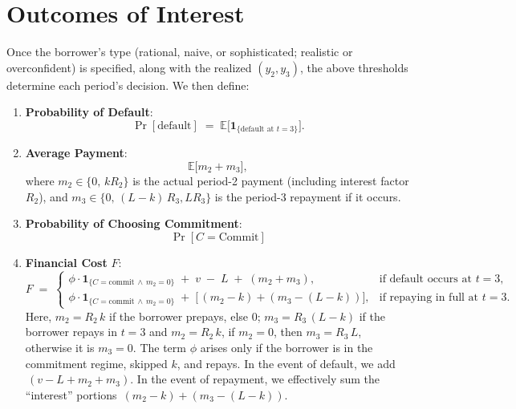 \documentclass[11pt]{article}
\begin{document}

\section{Outcomes of Interest}

Once the borrower’s type (rational, naive, or sophisticated; realistic or overconfident) is specified, along with the realized \((y_2,y_3)\), the above thresholds determine each period’s decision. We then define:

\begin{enumerate}
\item \textbf{Probability of Default}:
\[
\Pr[\text{default}] \;=\; \mathbb{E}\bigl[\mathbf{1}_{\{\text{default at }t=3\}}\bigr].
\]
\item \textbf{Average Payment}:
\[
\mathbb{E}\bigl[m_2 + m_3\bigr],
\]
where \(m_2 \in \{0,\,kR_2\}\) is the actual period-2 payment (including interest factor \(R_2\)), and \(m_3 \in \{0,\,(\!L\!-\!k\!)\,R_3, LR_3\}\) is the period-3 repayment if it occurs.
\item \textbf{Probability of Choosing Commitment}:
\[
\Pr[C = \text{Commit}]
\]
\item \textbf{Financial Cost} \(F\):
\[
F \;=\;
\begin{cases}
\displaystyle
\phi \cdot \mathbf{1}_{\{C=\text{commit} \,\wedge\, m_2=0\}}
\;+\;v \;-\;L \;+\;(m_2 + m_3),
&
\text{if default occurs at }t=3,
\\[6pt]
\displaystyle
\phi \cdot \mathbf{1}_{\{C=\text{commit} \,\wedge\, m_2=0\}}
\;+\;\bigl[\,(m_2 - k) + (m_3 - (L-k))\bigr],
&
\text{if repaying in full at }t=3.
\end{cases}
\]
\noindent
Here, \(m_2 = R_2\,k\) if the borrower prepays, else \(0\); \(m_3 = R_3\,(L - k)\) if the borrower repays in \(t=3\) and $m_2 =  R_2\,k$, if $m_2=0$, then \(m_3 = R_3\,L \), otherwise it is \(m_3=0\). The term \(\phi\) arises only if the borrower is in the commitment regime, skipped \(k\), and repays. In the event of default, we add \(\,(v - L + m_2 + m_3)\). In the event of repayment, we effectively sum the “interest” portions \(\,(m_2 - k) + (m_3 - (L-k))\).
\end{enumerate}
\end{document}
